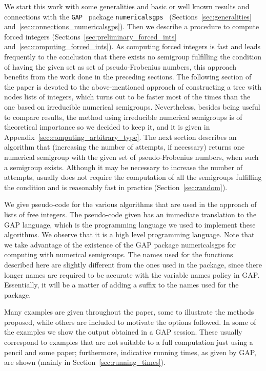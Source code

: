 \documentclass[11pt]{amsart}
\theoremstyle{remark}
\begin{document}
We start this work with some generalities and basic or well known results and connections with the \texttt{GAP}~\cite{GAP4} package \texttt{numericalsgps}~\cite{numericalsgps} (Sections~\ref{sec:generalities} and~\ref{sec:connections_numericalsgps}). Then we describe a procedure to compute forced integers (Sections~\ref{sec:preliminary_forced_ints} and~\ref{sec:computing_forced_ints}). As computing forced integers is fast and leads frequently to the conclusion that there exists no semigroup fulfilling the condition of having the given set as set of pseudo-Frobenius numbers, this approach benefits from the work done in the preceding sections.  
The following section of the paper is devoted to the above-mentioned approach of constructing a tree with nodes lists of integers, which turns out to be faster most of the times than the one based on irreducible numerical semigroups. Nevertheless, besides being useful to compare results, the method using irreducible numerical semigroups is of theoretical importance so we decided to keep it, and it is given in Appendix~\ref{sec:computing_arbitrary_type}.
The next section describes an algorithm that (increasing the number of attempts, if necessary) returns one numerical semigroup with the given set of pseudo-Frobenius numbers, when such a semigroup exists. Although it may be necessary to increase the number of attempts, usually does not require the computation of all the semigroups fulfilling the condition and is reasonably fast in practice (Section~\ref{sec:random}).

We give pseudo-code for the various algorithms that are used in the approach of lists of free integers. The pseudo-code given has an immediate translation to the \textsf{GAP} language, which is the programming language we used to implement these algorithms. We observe that it is a high level programming language. Note that we take advantage of the existence of the \textsf{GAP} package \textsf{numericalsgps} for computing with numerical semigroups. The names used for the functions described here are slightly different from the ones used in the package, since there longer names are required to be accurate with the variable names policy in \textsf{GAP}. Essentially, it will be a matter of adding a suffix to the names used for the package.

Many examples are given throughout the paper, some to illustrate the methods proposed, while others are included to motivate the options followed. In some of the examples we show the output obtained in a \textsf{GAP} session. These usually correspond to examples that are not suitable to a full computation just using a pencil and some paper; furthermore, indicative running times, as given by \textsf{GAP}, are shown (mainly in Section~\ref{sec:running_times}).
\end{document}
